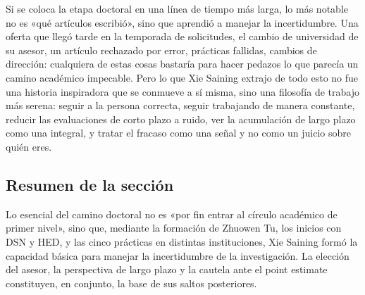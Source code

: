 Si se coloca la etapa doctoral en una línea de tiempo más larga, lo más notable no es «qué artículos escribió», sino que aprendió a manejar la incertidumbre. Una oferta que llegó tarde en la temporada de solicitudes, el cambio de universidad de su asesor, un artículo rechazado por error, prácticas fallidas, cambios de dirección: cualquiera de estas cosas bastaría para hacer pedazos lo que parecía un camino académico impecable. Pero lo que Xie Saining extrajo de todo esto no fue una historia inspiradora que se conmueve a sí misma, sino una filosofía de trabajo más serena: seguir a la persona correcta, seguir trabajando de manera constante, reducir las evaluaciones de corto plazo a ruido, ver la acumulación de largo plazo como una integral, y tratar el fracaso como una señal y no como un juicio sobre quién eres.

\subsection{Resumen de la sección}

Lo esencial del camino doctoral no es «por fin entrar al círculo académico de primer nivel», sino que, mediante la formación de Zhuowen Tu, los inicios con DSN y HED, y las cinco prácticas en distintas instituciones, Xie Saining formó la capacidad básica para manejar la incertidumbre de la investigación. La elección del asesor, la perspectiva de largo plazo y la cautela ante el point estimate constituyen, en conjunto, la base de sus saltos posteriores.
